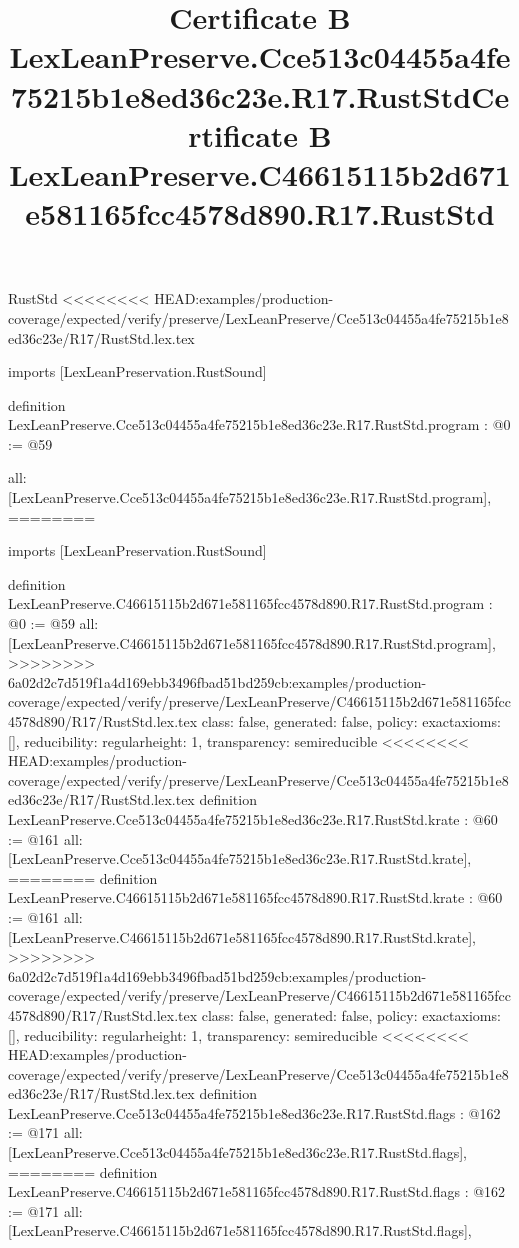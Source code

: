 \begin{lexlean}{RustStd}
<<<<<<<< HEAD:examples/production-coverage/expected/verify/preserve/LexLeanPreserve/Cce513c04455a4fe75215b1e8ed36c23e/R17/RustStd.lex.tex
\title{Certificate B LexLeanPreserve.Cce513c04455a4fe75215b1e8ed36c23e.R17.RustStd}
\begin{coremodule}
imports [LexLeanPreservation.RustSound]

definition LexLeanPreserve.Cce513c04455a4fe75215b1e8ed36c23e.R17.RustStd.program : @0 := @59 {
  all: [LexLeanPreserve.Cce513c04455a4fe75215b1e8ed36c23e.R17.RustStd.program],
========
\title{Certificate B LexLeanPreserve.C46615115b2d671e581165fcc4578d890.R17.RustStd}
\begin{coremodule}
imports [LexLeanPreservation.RustSound]

definition LexLeanPreserve.C46615115b2d671e581165fcc4578d890.R17.RustStd.program : @0 := @59 {
  all: [LexLeanPreserve.C46615115b2d671e581165fcc4578d890.R17.RustStd.program],
>>>>>>>> 6a02d2c7d519f1a4d169ebb3496fbad51bd259cb:examples/production-coverage/expected/verify/preserve/LexLeanPreserve/C46615115b2d671e581165fcc4578d890/R17/RustStd.lex.tex
  class: false,
  generated: false,
  policy: exact{axioms: []},
  reducibility: regular{height: 1},
  transparency: semireducible
}
<<<<<<<< HEAD:examples/production-coverage/expected/verify/preserve/LexLeanPreserve/Cce513c04455a4fe75215b1e8ed36c23e/R17/RustStd.lex.tex
definition LexLeanPreserve.Cce513c04455a4fe75215b1e8ed36c23e.R17.RustStd.krate : @60 := @161 {
  all: [LexLeanPreserve.Cce513c04455a4fe75215b1e8ed36c23e.R17.RustStd.krate],
========
definition LexLeanPreserve.C46615115b2d671e581165fcc4578d890.R17.RustStd.krate : @60 := @161 {
  all: [LexLeanPreserve.C46615115b2d671e581165fcc4578d890.R17.RustStd.krate],
>>>>>>>> 6a02d2c7d519f1a4d169ebb3496fbad51bd259cb:examples/production-coverage/expected/verify/preserve/LexLeanPreserve/C46615115b2d671e581165fcc4578d890/R17/RustStd.lex.tex
  class: false,
  generated: false,
  policy: exact{axioms: []},
  reducibility: regular{height: 1},
  transparency: semireducible
}
<<<<<<<< HEAD:examples/production-coverage/expected/verify/preserve/LexLeanPreserve/Cce513c04455a4fe75215b1e8ed36c23e/R17/RustStd.lex.tex
definition LexLeanPreserve.Cce513c04455a4fe75215b1e8ed36c23e.R17.RustStd.flags : @162 := @171 {
  all: [LexLeanPreserve.Cce513c04455a4fe75215b1e8ed36c23e.R17.RustStd.flags],
========
definition LexLeanPreserve.C46615115b2d671e581165fcc4578d890.R17.RustStd.flags : @162 := @171 {
  all: [LexLeanPreserve.C46615115b2d671e581165fcc4578d890.R17.RustStd.flags],
}}}
\end{coremodule}}
\end{coremodule}
\end{lexlean}
